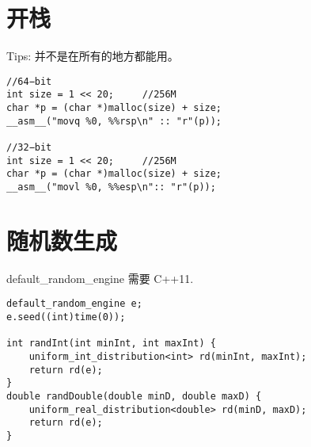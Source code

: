 \section{开栈}

Tips: 并不是在所有的地方都能用。

\begin{verbatim}
//64−bit
int size = 1 << 20;     //256M
char *p = (char *)malloc(size) + size;
__asm__("movq %0, %%rsp\n" :: "r"(p));

//32−bit
int size = 1 << 20;     //256M
char *p = (char *)malloc(size) + size;
__asm__("movl %0, %%esp\n":: "r"(p));
\end{verbatim}


\section{随机数生成}

default\_random\_engine 需要 C++11.

\begin{verbatim}
default_random_engine e;
e.seed((int)time(0));

int randInt(int minInt, int maxInt) {
    uniform_int_distribution<int> rd(minInt, maxInt);
    return rd(e);
}
double randDouble(double minD, double maxD) {
    uniform_real_distribution<double> rd(minD, maxD);
    return rd(e);
}
\end{verbatim}